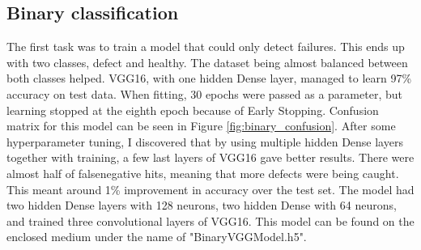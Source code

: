 \documentclass[thesis=B,english]{FITthesis}[2019/12/23]
\begin{document}
\subsection{Binary classification}\label{sec:binary_classification}
The first task was to train a model that could only detect failures. This ends up with two classes, defect and healthy. The dataset being almost balanced between both classes helped. VGG16, with one hidden Dense layer, managed to learn 97\% accuracy on test data. When fitting, 30 epochs were passed as a parameter, but learning stopped at the eighth epoch because of Early Stopping. Confusion matrix for this model can be seen in Figure \ref{fig:binary_confusion}. After some hyperparameter tuning, I discovered that by using multiple hidden Dense layers together with training, a few last layers of VGG16 gave better results. There were almost half of falsenegative hits, meaning that more defects were being caught. This meant around 1\% improvement in accuracy over the test set. The model had two hidden Dense layers with 128 neurons, two hidden Dense with 64 neurons, and trained three convolutional layers of VGG16. This model can be found on the enclosed medium under the name of "BinaryVGGModel.h5". 
\end{document}
